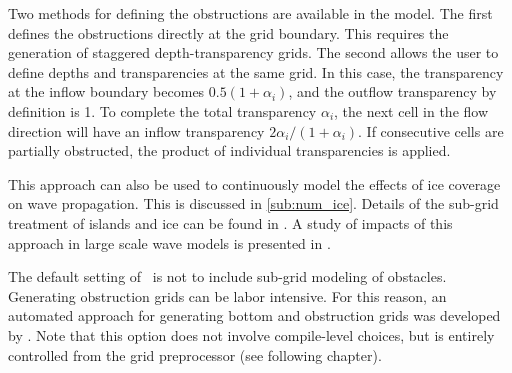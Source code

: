 Two methods for defining the obstructions are available in the model. The
first defines the obstructions directly at the grid boundary. This requires
the generation of staggered depth-transparency grids. The second allows the
user to define depths and transparencies at the same grid. In this case, the
transparency at the inflow boundary becomes $0.5(1+\alpha_i)$, and the outflow
transparency by definition is 1. To complete the total transparency
$\alpha_i$, the next cell in the flow direction will have an inflow
transparency $2\alpha_i/(1+\alpha_i)$. If consecutive cells are partially
obstructed, the product of individual transparencies is applied.

This approach can also be used to continuously model the effects of ice
coverage on wave propagation. This is discussed in \para\ref{sub:num_ice}.
Details of the sub-grid treatment of islands and ice can be found in
\cite{tol:OMOD03a}. A study of impacts of this approach in large scale wave
models is presented in \cite{tol:OMB02b,tol:OMOD03a}.

The default setting of \ws\ is not to include sub-grid modeling of
obstacles. Generating obstruction grids can be labor intensive. For this
reason, an automated approach for generating bottom and obstruction grids was
developed by \cite{tol:MMAB07a, tol:OMOD08a}.  Note that this option does not
involve compile-level choices, but is entirely controlled from the grid
preprocessor (see following chapter).

